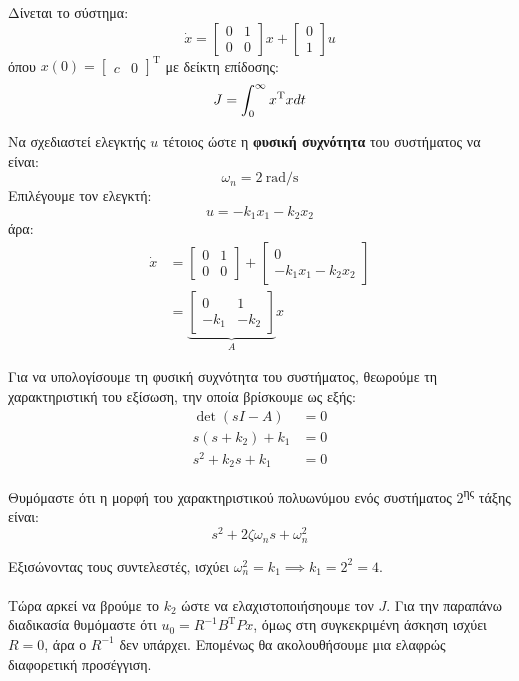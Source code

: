 \documentclass[11pt,a4paper,notitlepage,fleqn]{article}
\begin{document}

\begin{exercise}
	Δίνεται το σύστημα:
	\[
	\dot x = \left[\begin{matrix}
	0 & 1 \\ 0 & 0
	\end{matrix}\right]x + \left[\begin{matrix}
	0 \\ 1
	\end{matrix}\right]u
	\]
	όπου \( x(0) = \left[\begin{matrix}
	c & 0
	\end{matrix}\right]^{\mathrm{T}} \)
	με δείκτη επίδοσης:
	\[
	J = \int_{0}^{\infty} x^{\mathrm T}xd t
	\]
	
	Να σχεδιαστεί ελεγκτής \( u \) τέτοιος ώστε η \textbf{φυσική συχνότητα} του συστήματος να είναι:
	\[
	\omega_n = 2 \ \mathrm{rad/s}
	\]
	\tcblower
	Επιλέγουμε τον ελεγκτή:
	\[
	u = -k_1x_1 - k_2x_2
	\]
	άρα:
	\begin{align*}
		\dot x &= \left[\begin{matrix}
		0 & 1 \\ 0 & 0
		\end{matrix}\right] + \left[\begin{matrix}
		0 \\ -k_1x_1 - k_2x_2
		\end{matrix}\right]
		\\ &= \underbrace{\left[\begin{matrix}
		0 & 1 \\ -k_1 & -k_2
		\end{matrix}\right]}_{A}x
	\end{align*}
	
	Για να υπολογίσουμε τη φυσική συχνότητα του συστήματος, θεωρούμε τη χαρακτηριστική του εξίσωση, την
	οποία βρίσκουμε ως εξής:
	\begin{align*}
		\det(sI-A) &= 0\\
		s(s+k_2) + k_1 &= 0\\
		s^2 + k_2s + k_1 &= 0
	\end{align*}
	
	Θυμόμαστε ότι η μορφή του χαρακτηριστικού πολυωνύμου ενός συστήματος
	2\textsuperscript{ης} τάξης είναι:
	\[
	s^2 + 2ζ\omega_ns + \omega_n^2
	\]
	
	Εξισώνοντας τους συντελεστές, ισχύει \( \omega_n^2 = k_1 \implies
	k_1 = 2^2 = 4 \).
	
	\paragraph{}
	Τώρα αρκεί να βρούμε το \( k_2 \) ώστε να ελαχιστοποιήσηουμε
	τον \( J \). Για την παραπάνω διαδικασία θυμόμαστε ότι \( u_0
	= R^{-1}B^{\mathrm T}Px \), όμως στη συγκεκριμένη άσκηση
	ισχύει \( R=0 \), άρα ο \( R^{-1} \) δεν υπάρχει. Επομένως θα
	ακολουθήσουμε μια ελαφρώς διαφορετική προσέγγιση.
	

\end{exercise}
\end{document}
